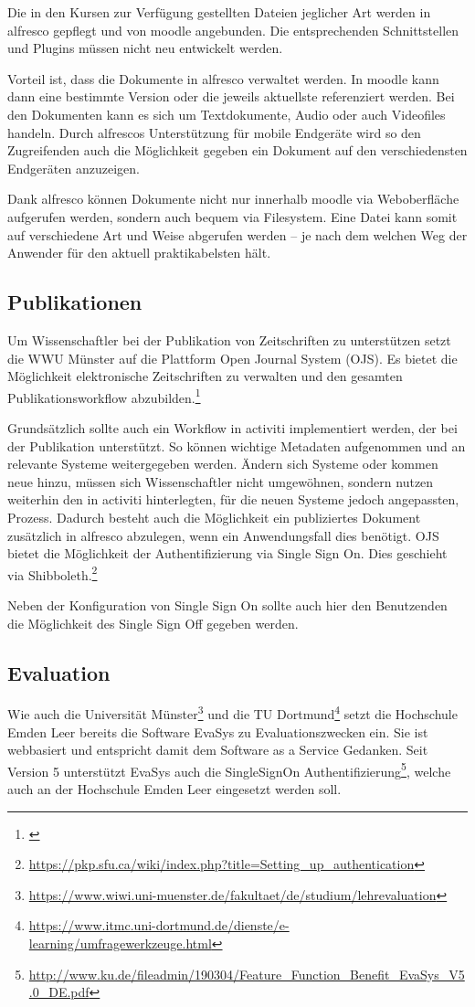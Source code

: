 Die in den Kursen zur Verfügung gestellten Dateien jeglicher Art werden in alfresco gepflegt und von moodle angebunden. Die entsprechenden Schnittstellen und Plugins müssen nicht neu entwickelt werden.

Vorteil ist, dass die Dokumente in alfresco verwaltet werden. In moodle kann dann eine bestimmte Version oder die jeweils aktuellste referenziert werden. Bei den Dokumenten kann es sich um Textdokumente, Audio oder auch Videofiles handeln. Durch alfrescos Unterstützung für mobile Endgeräte wird so den Zugreifenden auch die Möglichkeit gegeben ein Dokument auf den verschiedensten Endgeräten anzuzeigen.

Dank alfresco können Dokumente nicht nur innerhalb moodle via Weboberfläche aufgerufen werden, sondern auch bequem via Filesystem. Eine Datei kann somit auf verschiedene Art und Weise abgerufen werden – je nach dem welchen Weg der Anwender für den aktuell praktikabelsten hält.

\subsection{Publikationen}
Um Wissenschaftler bei der Publikation von Zeitschriften zu unterstützen setzt die WWU Münster auf die Plattform Open Journal System (OJS). Es bietet die Möglichkeit elektronische Zeitschriften zu verwalten und den gesamten Publikationsworkflow abzubilden.\footnote{\cite{kloetgen_2012}}

Grundsätzlich sollte auch ein Workflow in activiti implementiert werden, der bei der Publikation unterstützt. So können wichtige Metadaten aufgenommen und an relevante Systeme weitergegeben werden. Ändern sich Systeme oder kommen neue hinzu, müssen sich Wissenschaftler nicht umgewöhnen, sondern nutzen weiterhin den in activiti hinterlegten, für die neuen Systeme jedoch angepassten, Prozess. Dadurch besteht auch die Möglichkeit ein publiziertes Dokument zusätzlich in alfresco abzulegen, wenn ein Anwendungsfall dies benötigt.
OJS bietet die Möglichkeit der Authentifizierung via Single Sign On. Dies geschieht via Shibboleth.\footnote{\url{https://pkp.sfu.ca/wiki/index.php?title=Setting_up_authentication}}

Neben der Konfiguration von Single Sign On sollte auch hier den Benutzenden die Möglichkeit des Single Sign Off gegeben werden.

\subsection{Evaluation}
Wie auch die Universität Münster\footnote{\url{https://www.wiwi.uni-muenster.de/fakultaet/de/studium/lehrevaluation}} und die TU Dortmund\footnote{\url{https://www.itmc.uni-dortmund.de/dienste/e-learning/umfragewerkzeuge.html}} setzt die Hochschule Emden Leer bereits die Software EvaSys zu Evaluationszwecken ein. Sie ist webbasiert und entspricht damit dem Software as a Service Gedanken.
Seit Version 5 unterstützt EvaSys auch die SingleSignOn Authentifizierung\footnote{\url{http://www.ku.de/fileadmin/190304/Feature_Function_Benefit_EvaSys_V5.0_DE.pdf}}, welche auch an der Hochschule Emden Leer eingesetzt werden soll.

